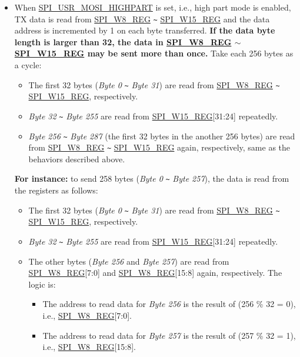 \documentclass[main\_\_EN.tex]{subfiles}
\begin{document}
\begin{itemize}
\begin{itemize}
        \item When \hyperref[fielddesc:SPIUSRMOSIHIGHPART]{SPI\_USR\_MOSI\_HIGHPART} is set, i.e., high part mode is enabled, TX data is read from \hyperref[regdesc:SPIW0REG]{SPI\_W8\_REG} \verb+~+ \hyperref[regdesc:SPIW0REG]{SPI\_W15\_REG} and the data address is incremented by 1 on each byte transferred. \textbf{If the data byte length is larger than 32, the data in \hyperref[regdesc:SPIW0REG]{SPI\_W8\_REG} $\sim$ \hyperref[regdesc:SPIW0REG]{SPI\_W15\_REG} may be sent more than once.} Take each 256 bytes as a cycle:
        \begin{itemize}
            \item The first 32 bytes (\emph{Byte 0} \verb+~+ \emph{Byte 31}) are read from \hyperref[regdesc:SPIW0REG]{SPI\_W8\_REG} \verb+~+ \hyperref[regdesc:SPIW0REG]{SPI\_W15\_REG}, respectively.
            \item \emph{Byte 32} \verb+~+ \emph{Byte 255} are read from \hyperref[regdesc:SPIW0REG]{SPI\_W15\_REG}[31:24] repeatedly.
            \item \emph{Byte 256} \verb+~+ \emph{Byte 287} (the first 32 bytes in the another 256 bytes) are read from \hyperref[regdesc:SPIW0REG]{SPI\_W8\_REG} \verb+~+ \hyperref[regdesc:SPIW0REG]{SPI\_W15\_REG} again, respectively, same as the behaviors described above.
        \end{itemize}
        \textbf{For instance:} to send 258 bytes (\emph{Byte 0} \verb+~+ \emph{Byte 257}), the data is read from the registers as follows:
        \begin{itemize}
            \item The first 32 bytes (\emph{Byte 0} \verb+~+ \emph{Byte 31}) are read from \hyperref[regdesc:SPIW0REG]{SPI\_W8\_REG} \verb+~+ \hyperref[regdesc:SPIW0REG]{SPI\_W15\_REG}, respectively.
            \item \emph{Byte 32} \verb+~+ \emph{Byte 255} are read from \hyperref[regdesc:SPIW0REG]{SPI\_W15\_REG}[31:24] repeatedly.
            \item The other bytes (\emph{Byte 256} and \emph{Byte 257}) are read from \hyperref[regdesc:SPIW0REG]{SPI\_W8\_REG}[7:0] and \hyperref[regdesc:SPIW0REG]{SPI\_W8\_REG}[15:8] again, respectively. The logic is:
            \begin{itemize}
                \item The address to read data for \emph{Byte 256} is the result of (256 \% 32 = 0), i.e., \hyperref[regdesc:SPIW0REG]{SPI\_W8\_REG}[7:0].
                \item The address to read data for \emph{Byte 257} is the result of (257 \% 32 = 1), i.e., \hyperref[regdesc:SPIW0REG]{SPI\_W8\_REG}[15:8].
            \end{itemize}
        \end{itemize}
    \end{itemize}


\end{itemize}
\end{document}
